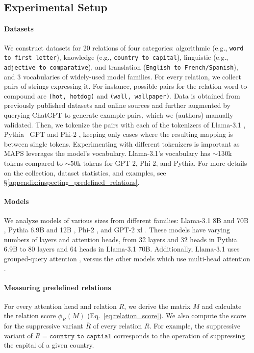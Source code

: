 \documentclass[11pt]{article}
\newcommand{\llama}{Llama-3.1}
\newcommand{\PHI}{Phi-2}
\newcommand{\PythiaSevenB}{Pythia 6.9B}
\newcommand{\Pythia}{Pythia}
\newcommand{\GPT}{GPT-2}
\newcommand{\GPTxl}{GPT-2 xl}
\newcommand{\framework}{\textsc{MAPS}}
\begin{document}
\subsection{Experimental Setup}
\label{subsec:predefined_relations_experimental}

\paragraph{Datasets} We construct datasets for 20 relations of four categories: algorithmic (e.g., \texttt{word to first letter}), knowledge (e.g., \texttt{country to capital}), linguistic (e.g., \texttt{adjective to comparative}), and translation (\texttt{English to French/Spanish}), and 3 vocabularies of widely-used model families. 
For every relation, we collect pairs of strings expressing it. For instance, possible pairs for the relation word-to-compound are \texttt{(hot, hotdog)} and \texttt{(wall, wallpaper)}. Data is obtained from previously published datasets and online sources and further augmented by querying ChatGPT to generate example pairs, which we (authors) manually validated.
Then, we tokenize the pairs with each of the tokenizers of \llama{} \cite{dubey2024llama}, \Pythia{} \cite{biderman2023pythia}\, GPT{} \cite{radford2019language} and \PHI{} \cite{phi2}, keeping only cases where the resulting mapping is between single tokens.
Experimenting with different tokenizers is important as \framework{} leverages the model's vocabulary. \llama's vocabulary has $\sim$130k tokens compared to $\sim$50k tokens for \GPT{}, \PHI{}, and \Pythia{}.
For more details on the collection, dataset statistics, and examples, see \S\ref{appendix:inspecting_predefined_relations}.



\paragraph{Models} We analyze models of various sizes from different families: {\llama} 8B and 70B \cite{dubey2024llama}, {\Pythia} 6.9B and 12B \cite{biderman2023pythia}, {\PHI} \cite{phi2}, and {\GPTxl} \cite{radford2019language}. These models have varying numbers of layers and attention heads, from 32 layers and 32 heads in \PythiaSevenB{} to 80 layers and 64 heads in \llama{} 70B. Additionally, \llama{} uses grouped-query attention \cite{Ainslie2023GQATG}, versus the other models which use multi-head attention \cite{Vaswani2017AttentionIA}.

\paragraph{Measuring predefined relations}
For every attention head and relation $R$, we derive the matrix $M$ and calculate the relation score $\phi_R(M)$ (Eq.~\ref{eq:relation_score}). We also compute the score for the suppressive variant $\bar{R}$ of every relation $R$. For example, the suppressive variant of $R = \texttt{country to captial}$ corresponds to the operation of suppressing the capital of a given country.
\end{document}
